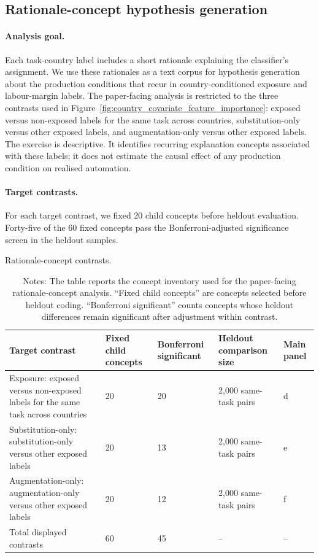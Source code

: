 \documentclass[11pt]{article}
\begin{document}
\subsection{Rationale-concept hypothesis generation}
\label{sec:appendix_rationale_concept_analysis}

\paragraph{Analysis goal.}

Each task-country label includes a short rationale explaining the classifier's assignment. We use these rationales as a text corpus for hypothesis generation about the production conditions that recur in country-conditioned exposure and labour-margin labels. The paper-facing analysis is restricted to the three contrasts used in Figure~\ref{fig:country_covariate_feature_importance}: exposed versus non-exposed labels for the same task across countries, substitution-only versus other exposed labels, and augmentation-only versus other exposed labels. The exercise is descriptive. It identifies recurring explanation concepts associated with these labels; it does not estimate the causal effect of any production condition on realised automation.

\paragraph{Target contrasts.}

For each target contrast, we fixed 20 child concepts before heldout evaluation. Forty-five of the 60 fixed concepts pass the Bonferroni-adjusted significance screen in the heldout samples.

\begin{table}[!htbp]
\centering
\caption{Rationale-concept contrasts.}
\label{tab:appendix_rationale_concept_target_families}
\begin{tabular}{L{6.0cm} C{2.0cm} C{2.2cm} C{2.6cm} C{1.5cm}}
\toprule
Target contrast & Fixed child concepts & Bonferroni significant & Heldout comparison size & Main panel \\
\midrule
Exposure: exposed versus non-exposed labels for the same task across countries & 20 & 20 & 2,000 same-task pairs & d \\
Substitution-only: substitution-only versus other exposed labels & 20 & 13 & 2,000 same-task pairs & e \\
Augmentation-only: augmentation-only versus other exposed labels & 20 & 12 & 2,000 same-task pairs & f \\
\midrule
Total displayed contrasts & 60 & 45 & -- & -- \\
\bottomrule
\end{tabular}
\caption*{\footnotesize Notes: The table reports the concept inventory used for the paper-facing rationale-concept analysis. ``Fixed child concepts'' are concepts selected before heldout coding. ``Bonferroni significant'' counts concepts whose heldout differences remain significant after adjustment within contrast.}
\end{table}
\end{document}
